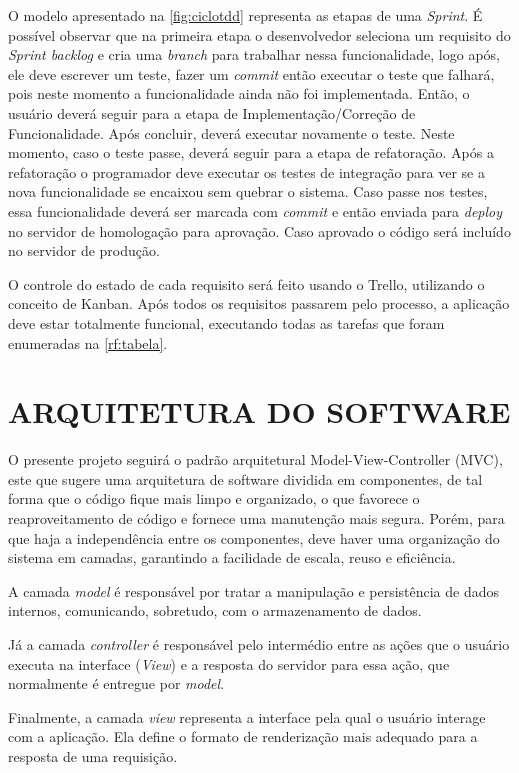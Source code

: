 O modelo apresentado na \autoref{fig:ciclotdd} representa as etapas de uma \textit{Sprint}. É possível observar que na primeira etapa o desenvolvedor seleciona um requisito do \textit{Sprint backlog} e cria uma \textit{branch} para trabalhar nessa funcionalidade, logo após, ele deve escrever um teste, fazer um \textit{commit} então executar o teste que falhará, pois neste momento a funcionalidade ainda não foi implementada. Então, o usuário deverá seguir para a etapa de Implementação/Correção de Funcionalidade. Após concluir, deverá executar novamente o teste. Neste momento, caso o teste passe, deverá seguir para a etapa de refatoração. Após a refatoração o programador deve executar os testes de integração para ver se a nova funcionalidade se encaixou sem quebrar o sistema. Caso passe nos testes, essa funcionalidade deverá ser marcada com \textit{commit} e então enviada para \textit{deploy} no servidor de homologação para aprovação. Caso aprovado o código será incluído no servidor de produção.

O controle do estado de cada requisito será feito usando o Trello, utilizando o conceito de Kanban. Após todos os requisitos passarem pelo processo, a aplicação deve estar totalmente funcional, executando todas as tarefas que foram enumeradas na \autoref{rf:tabela}.

\section{ARQUITETURA DO SOFTWARE}
\label{sub:arquitetura}

O presente projeto seguirá o padrão arquitetural Model-View-Controller (MVC), este que  sugere uma arquitetura de software dividida em componentes, de tal forma que o código fique mais limpo e organizado, o que favorece o reaproveitamento de código e fornece uma manutenção mais segura. Porém, para que haja a independência entre os componentes, deve haver uma organização do sistema em camadas, garantindo a facilidade de escala, reuso e eficiência.

A camada \textit{model} é responsável por tratar a manipulação e persistência de dados internos, comunicando, sobretudo, com o armazenamento de dados.

Já a camada \textit{controller} é responsável pelo intermédio entre as ações que o usuário executa na interface (\textit{View}) e a resposta do servidor para essa ação, que normalmente é entregue por \textit{model}. 

Finalmente, a camada \textit{view} representa a interface pela qual o usuário interage com a aplicação. Ela define o formato de renderização mais adequado para a resposta de uma requisição.

